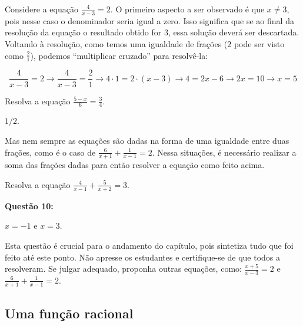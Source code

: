 \documentclass[main.tex]{subfiles}
\begin{document}
Considere a equação $\frac{4}{x-3}=2$. O primeiro aspecto a ser observado é que $x\neq3$, pois nesse caso o denominador seria igual a zero. Isso significa que se ao final da resolução da equação o resultado obtido for $3$, essa solução deverá ser descartada. Voltando à resolução, como temos uma igualdade de frações ($2$ pode ser visto como $\frac{2}{1}$), podemos ``multiplicar cruzado'' para resolvê-la:

$$ \frac{4}{x-3}=2 \longrightarrow \frac{4}{x-3}=\frac{2}{1} \longrightarrow 4 \cdot 1 = 2 \cdot (x-3) \longrightarrow 4=2x-6 \longrightarrow 2x=10 \longrightarrow x=5 $$

\begin{questao}
Resolva a equação $\frac{5-x}{6}=\frac{3}{4}$.
\end{questao}

\begin{gabarito}
	\begin{gabaritoQuestao}
		$1/2$.
	\end{gabaritoQuestao}
\end{gabarito}

Mas nem sempre as equações são dadas na forma de uma igualdade entre duas frações, como é o caso de $\frac{6}{x+1}+\frac{1}{x-1}=2$. Nessa situações, é necessário realizar a soma das frações dadas para então resolver a equação como feito acima.

\begin{questao}
Resolva a equação $\frac{4}{x-1}+\frac{5}{x+2}=3$.
\end{questao}

\noindent\textbf{Questão 10:} 
\begin{gabarito}
	\begin{gabaritoQuestao}
		$x=-1$ e $x=3$.
	\end{gabaritoQuestao}
\end{gabarito}

\paraTutores

Esta questão é crucial para o andamento do capítulo, pois sintetiza tudo que foi feito até este ponto. Não apresse os estudantes e certifique-se de que todos a resolveram. Se julgar adequado, proponha outras equações, como: $\frac{x+5}{x-3}=2$ e $\frac{6}{x+1}+\frac{1}{x-1}=2$.

\paraAmbos

\subsection*{Uma função racional}
\end{document}
